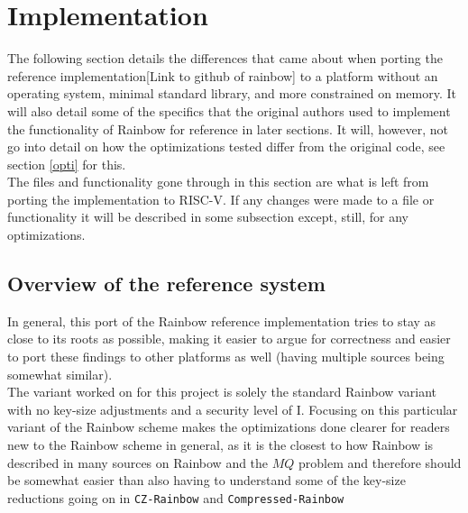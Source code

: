 \section{Implementation}
The following section details the differences that came about when porting the reference implementation[Link to github of rainbow] to a platform without an operating system, minimal standard library, and more constrained on memory. It will also detail some of the specifics that the original authors used to implement the functionality of Rainbow for reference in later sections. It will, however, not go into detail on how the optimizations tested differ from the original code, see section \ref{opti} for this.\medskip\\
The files and functionality gone through in this section are what is left from porting the implementation to RISC-V. If any changes were made to a file or functionality it will be described in some subsection except, still, for any optimizations.
\subsection{Overview of the reference system}
In general, this port of the Rainbow reference implementation tries to stay as close to its roots as possible, making it easier to argue for correctness and easier to port these findings to other platforms as well (having multiple sources being somewhat similar).
\medskip\\
The variant worked on for this project is solely the standard Rainbow variant with no key-size adjustments and a security level of I. Focusing on this particular variant of the Rainbow scheme makes the optimizations done clearer for readers new to the Rainbow scheme in general, as it is the closest to how Rainbow is described in many sources on Rainbow and the $MQ$ problem and therefore should be somewhat easier than also having to understand some of the key-size reductions going on in \texttt{CZ-Rainbow} and \texttt{Compressed-Rainbow}
